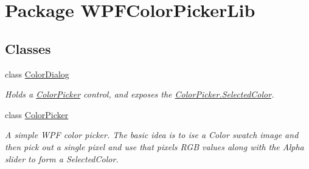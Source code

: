 \hypertarget{namespace_w_p_f_color_picker_lib}{
\section{Package WPFColorPickerLib}
\label{namespace_w_p_f_color_picker_lib}
}
\subsection*{Classes}
\begin{DoxyCompactItemize}
\item 
class \hyperlink{class_w_p_f_color_picker_lib_1_1_color_dialog}{ColorDialog}
\begin{DoxyCompactList}\small\item\em Holds a \hyperlink{class_w_p_f_color_picker_lib_1_1_color_picker}{ColorPicker} control, and exposes the \hyperlink{class_w_p_f_color_picker_lib_1_1_color_picker_a0507e30a334f6bdff5b4b7533a4d1689}{ColorPicker.SelectedColor}. \item\end{DoxyCompactList}\item 
class \hyperlink{class_w_p_f_color_picker_lib_1_1_color_picker}{ColorPicker}
\begin{DoxyCompactList}\small\item\em A simple WPF color picker. The basic idea is to ise a Color swatch image and then pick out a single pixel and use that pixels RGB values along with the Alpha slider to form a SelectedColor. \item\end{DoxyCompactList}\end{DoxyCompactItemize}
